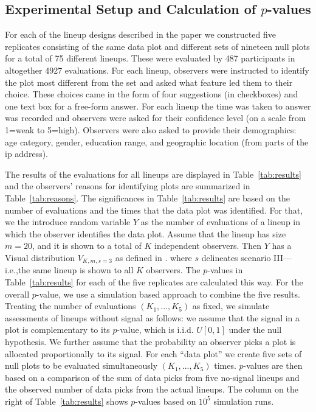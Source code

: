 \documentclass[12pt]{article} %
\begin{document}
\subsection{Experimental Setup and Calculation of $p$-values}\label{sec:pvalues}
For each of the lineup designs described in the paper we constructed five replicates consisting of the same data plot and different sets of nineteen null plots for a total of 75 different lineups. These were evaluated by 487 participants in altogether 4927 evaluations. For each lineup, observers were instructed to identify the plot  most different from the set and asked what feature led them to their choice. 
These choices came in the form of four suggestions (in checkboxes) and one text box for a free-form answer. For each lineup the time was taken to answer was recorded and  observers were asked for their confidence level (on a scale from 1=weak to 5=high). Observers were also asked to provide their demographics: age category, gender,  education range, and geographic location (from parts of the ip address). 

The results of the evaluations for all lineups  are displayed in Table~\ref{tab:results} and the observers' reasons for identifying plots are summarized in Table~\ref{tab:reasons}. 
The significances in Table~\ref{tab:results} are based on the number of evaluations and the times that the data plot was identified. For that, we the introduce random variable $Y$ as the  number of evaluations of a lineup in which the observer identifies the data plot. Assume that the lineup has size $m=20$, and it is shown to a total of $K$ independent observers.  Then $Y$ has a Visual distribution $V_{K, m, s=3}$ as defined in \citet{hofmann:2015}.
where $s$ delineates scenario III---i.e.,the same lineup is shown to all $K$ observers. The $p$-values in Table~\ref{tab:results} for each of the five replicates are calculated this way.
For the overall $p$-value, we use a simulation based approach to combine the five results. Treating the number of evaluations $(K_1, ..., K_5)$ as fixed, we simulate assessments of lineups without signal as follows: we assume that the signal in a plot is complementary to its $p$-value, which is i.i.d. $U[0,1]$ under the null hypothesis. We further assume that the probability an observer picks a  plot  is allocated proportionally to its signal. For each ``data plot'' we create five sets of null plots to be evaluated simultaneously $(K_1, ..., K_5)$ times.  
$p$-values are then based on a comparison of the sum of data picks from  five no-signal lineups and  the observed number of data picks from the actual lineups. The column on the right of Table~\ref{tab:results} shows $p$-values based on $10^5$ simulation runs.
\end{document}
